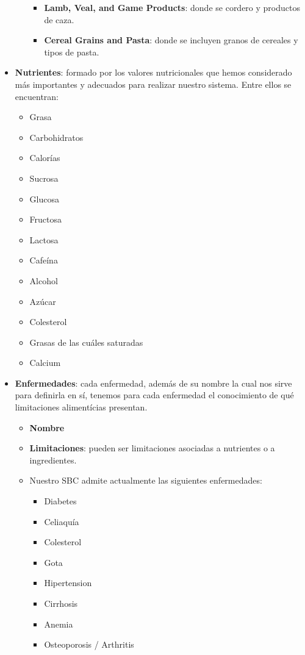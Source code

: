 \documentclass[12]{article}
\begin{document}
\begin{itemize}
\begin{itemize}
\begin{itemize}
			\item \textbf{Lamb, Veal, and Game Products}: donde se cordero y productos de caza.
			\item \textbf{Cereal Grains and Pasta}: donde se incluyen granos de cereales y tipos de pasta.
			\end{itemize}
		\end{itemize}
	\item \textbf{Nutrientes}: formado por los valores nutricionales que hemos considerado más importantes y adecuados para realizar nuestro sistema. Entre ellos se encuentran: 
	\begin{itemize} 
		\item Grasa
		\item Carbohidratos
		\item Calorías
		\item Sucrosa
		\item Glucosa
		\item Fructosa
		\item Lactosa
		\item Cafeína
		\item Alcohol
		\item Azúcar
		\item Colesterol
		\item Grasas de las cuáles saturadas
		\item Calcium
	\end{itemize}


\item \textbf{Enfermedades}: cada enfermedad, además de su nombre la cual nos sirve para definirla en sí, tenemos para cada enfermedad el conocimiento de qué limitaciones alimentícias presentan. \begin{itemize}
	\item \textbf{Nombre}
	\item \textbf{Limitaciones}: pueden ser limitaciones asociadas a nutrientes o a ingredientes.
	\item Nuestro SBC admite actualmente las siguientes enfermedades:
		\begin{itemize}
		\item Diabetes
		\item Celiaquía
		\item Colesterol
		\item Gota
		\item Hipertension
		\item Cirrhosis
		\item Anemia
		\item Osteoporosis / Arthritis
		\end{itemize}
\end{itemize}
\end{itemize}
\end{document}
